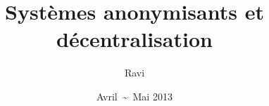 \documentclass[10pt]{article}
\title{Systèmes anonymisants et décentralisation}
\author{Ravi \bsc{Pachy}}
\date{Avril~\textasciitilde~Mai 2013}
\begin{document}
\renewcommand{\contentsname}{Sommaire}
\maketitle
\end{document}
